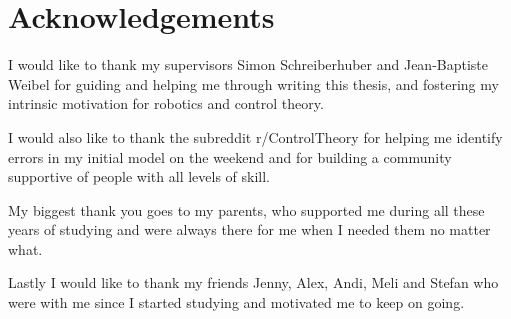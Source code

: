 \documentclass[class=report, crop=false]{standalone}
\begin{document}
\chapter{Acknowledgements}\label{cha:acknowledgements}

I would like to thank my supervisors Simon Schreiberhuber and Jean-Baptiste Weibel for guiding and helping me through writing this thesis, and fostering my intrinsic motivation for robotics and control theory.

I would also like to thank the subreddit r/ControlTheory for helping me identify errors in my initial model on the weekend and for building a community supportive of people with all levels of skill.

My biggest thank you goes to my parents, who supported me during all these years of studying and were always there for me when I needed them no matter what.

Lastly I would like to thank my friends Jenny, Alex, Andi, Meli and Stefan who were with me since I started studying and motivated me to keep on going.
\end{document}
